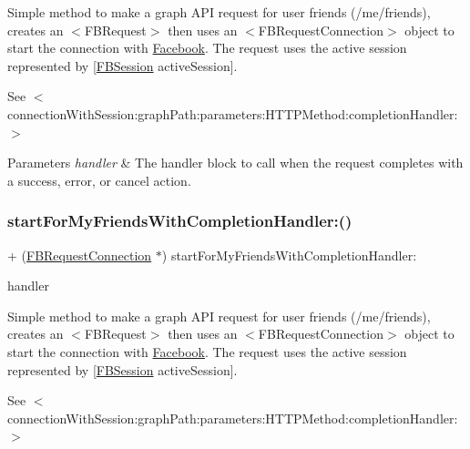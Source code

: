 Simple method to make a graph A\+PI request for user friends (/me/friends), creates an $<$\+F\+B\+Request$>$ then uses an $<$\+F\+B\+Request\+Connection$>$ object to start the connection with \hyperlink{interfaceFacebook}{Facebook}. The request uses the active session represented by {\ttfamily \mbox{[}\hyperlink{interfaceFBSession}{F\+B\+Session} active\+Session\mbox{]}}.

See $<$connection\+With\+Session\+:graph\+Path\+:parameters\+:\+H\+T\+T\+P\+Method\+:completion\+Handler\+:$>$


\begin{DoxyParams}{Parameters}
{\em handler} & The handler block to call when the request completes with a success, error, or cancel action. \\
\hline
\end{DoxyParams}
\mbox{\label{interfaceFBRequestConnection_a1eeb9942474312db3197be0fa569bc60}} 
\subsubsection{\texorpdfstring{start\+For\+My\+Friends\+With\+Completion\+Handler\+:()}{startForMyFriendsWithCompletionHandler:()}\hspace{0.1cm}{\footnotesize\ttfamily [4/5]}}
{\footnotesize\ttfamily + (\hyperlink{interfaceFBRequestConnection}{F\+B\+Request\+Connection} $\ast$) start\+For\+My\+Friends\+With\+Completion\+Handler\+: \begin{DoxyParamCaption}\item[{(F\+B\+Request\+Handler)}]{handler }\end{DoxyParamCaption}}

Simple method to make a graph A\+PI request for user friends (/me/friends), creates an $<$\+F\+B\+Request$>$ then uses an $<$\+F\+B\+Request\+Connection$>$ object to start the connection with \hyperlink{interfaceFacebook}{Facebook}. The request uses the active session represented by {\ttfamily \mbox{[}\hyperlink{interfaceFBSession}{F\+B\+Session} active\+Session\mbox{]}}.

See $<$connection\+With\+Session\+:graph\+Path\+:parameters\+:\+H\+T\+T\+P\+Method\+:completion\+Handler\+:$>$


